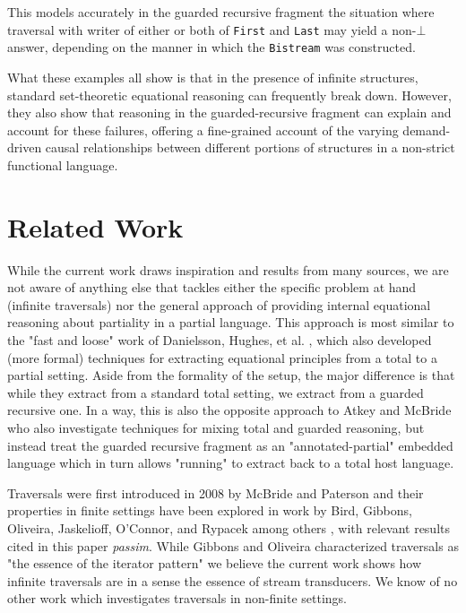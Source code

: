 \documentclass[sigplan,screen]{acmart}
\newcommand{\hs}{\texttt}
\begin{document}
This models accurately in the guarded recursive fragment the situation where traversal with writer of either or both of \hs{First} and \hs{Last} may yield a non-$\bot$ answer, depending on the manner in which the \hs{Bistream} was constructed. 

What these examples all show is that in the presence of infinite structures, standard set-theoretic equational reasoning can frequently break down. However, they also show that reasoning in the guarded-recursive fragment can explain and account for these failures, offering a fine-grained account of the varying demand-driven causal relationships between different portions of structures in a non-strict functional language.


\section{Related Work}

While the current work draws inspiration and results from many sources, we are not aware of anything else that tackles either the specific problem at hand (infinite traversals) nor the general approach of providing internal equational reasoning about partiality in a partial language. This approach is most similar to the "fast and loose" work of Danielsson, Hughes, et al. \cite{danielsson2006fast}, which also developed (more formal) techniques for extracting equational principles from a total to a partial setting. Aside from the formality of the setup, the major difference is that while they extract from a standard total setting, we extract from a guarded recursive one. In a way, this is also the opposite approach to Atkey and McBride \cite{atkey2013productive} who also investigate techniques for mixing total and guarded reasoning, but instead treat the guarded recursive fragment as an "annotated-partial" embedded language which in turn allows "running" to extract back to a total host language.

Traversals were first introduced in 2008 by McBride and Paterson \cite{mcbride2008applicative} and their properties in finite settings have been explored in work by Bird, Gibbons, Oliveira, Jaskelioff, O'Connor, and Rypacek among others \cite{gibbons2009essence, jaskelioff2012investigation, bird2013understanding, jaskelioff2015representation}, with relevant results cited in this paper \emph{passim}. While Gibbons and Oliveira characterized traversals as "the essence of the iterator pattern" we believe the current work shows how infinite traversals are in a sense the essence of stream transducers. We know of no other work which investigates traversals in non-finite settings.
\end{document}

